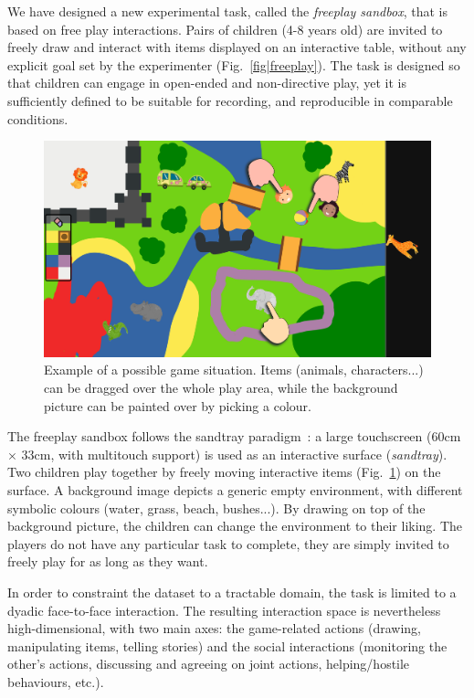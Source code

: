 \documentclass{article}
\begin{document}
We have designed a new experimental task, called the \emph{freeplay sandbox}, that is based on 
free play interactions. Pairs of children (4-8 years old) are invited to freely draw and interact with items
displayed on an interactive table, without any explicit goal set by the experimenter (Fig.~\ref{fig|freeplay}).
The task is designed so that children can engage in open-ended and non-directive play, yet it is
sufficiently defined to be suitable for recording, and reproducible in comparable conditions.

\begin{figure}[ht!]
    \centering
    \includegraphics[width=0.8\linewidth]{sandbox}
    \caption{Example of a possible game situation. Items (animals,
    characters...) can be dragged over the whole play area, while the background
    picture can be painted over by picking a colour.}

    \label{fig|sandbox}
\end{figure}

The freeplay sandbox follows the sandtray
paradigm~\cite{baxter2012touchscreen}: a large touchscreen (60cm $\times$ 33cm,
with multitouch support) is used as an interactive surface (\emph{sandtray}). Two children play together
by freely moving interactive items (Fig.~\ref{fig|sandbox}) on the surface. A background image
depicts a generic empty environment, with different symbolic colours (water,
grass, beach, bushes...). By drawing on top of the background picture, the
children can change the environment to their liking. The players do not have any particular task to
complete, they are simply invited to freely play for as long as they want.

In order to constraint the dataset to a tractable domain, the task is limited to
a dyadic face-to-face interaction.  The resulting interaction space is
nevertheless high-dimensional, with two main axes: the game-related actions
(drawing, manipulating items, telling stories) and the social interactions
(monitoring the other's actions, discussing and agreeing on joint actions,
helping/hostile behaviours, etc.).
\end{document}
